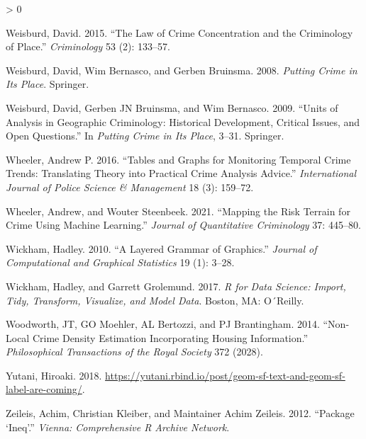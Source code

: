 \documentclass[
  krantz2]{krantz}
\newlength{\cslhangindent}
\newenvironment{CSLReferences}[2] %
 {%
  \setlength{\parindent}{0pt}
  \ifodd #1 \everypar{\setlength{\hangindent}{\cslhangindent}}\ignorespaces\fi
  \ifnum #2 > 0
  \setlength{\parskip}{#2\baselineskip}
  \fi
 }%
 {}
\begin{document}
\begin{CSLReferences}{1}{0}
\leavevmode\hypertarget{ref-Weisburd_2015}{}%
Weisburd, David. 2015. {``The Law of Crime Concentration and the Criminology of Place.''} \emph{Criminology} 53 (2): 133--57.

\leavevmode\hypertarget{ref-Weisburd_2008}{}%
Weisburd, David, Wim Bernasco, and Gerben Bruinsma. 2008. \emph{Putting Crime in Its Place}. Springer.

\leavevmode\hypertarget{ref-Weisburd_2009}{}%
Weisburd, David, Gerben JN Bruinsma, and Wim Bernasco. 2009. {``Units of Analysis in Geographic Criminology: Historical Development, Critical Issues, and Open Questions.''} In \emph{Putting Crime in Its Place}, 3--31. Springer.

\leavevmode\hypertarget{ref-Wheeler_2016}{}%
Wheeler, Andrew P. 2016. {``Tables and Graphs for Monitoring Temporal Crime Trends: Translating Theory into Practical Crime Analysis Advice.''} \emph{International Journal of Police Science \& Management} 18 (3): 159--72.

\leavevmode\hypertarget{ref-Wheeler_2021}{}%
Wheeler, Andrew, and Wouter Steenbeek. 2021. {``Mapping the Risk Terrain for Crime Using Machine Learning.''} \emph{Journal of Quantitative Criminology} 37: 445--80.

\leavevmode\hypertarget{ref-Wickham_2010}{}%
Wickham, Hadley. 2010. {``A Layered Grammar of Graphics.''} \emph{Journal of Computational and Graphical Statistics} 19 (1): 3--28.

\leavevmode\hypertarget{ref-Wickham_2017}{}%
Wickham, Hadley, and Garrett Grolemund. 2017. \emph{R for Data Science: Import, Tidy, Transform, Visualize, and Model Data}. Boston, MA: O´Reilly.

\leavevmode\hypertarget{ref-Woodworth_2014}{}%
Woodworth, JT, GO Moehler, AL Bertozzi, and PJ Brantingham. 2014. {``Non-Local Crime Density Estimation Incorporating Housing Information.''} \emph{Philosophical Transactions of the Royal Society} 372 (2028).

\leavevmode\hypertarget{ref-Yutani_2018}{}%
Yutani, Hiroaki. 2018. \url{https://yutani.rbind.io/post/geom-sf-text-and-geom-sf-label-are-coming/}.

\leavevmode\hypertarget{ref-zeileis2012package}{}%
Zeileis, Achim, Christian Kleiber, and Maintainer Achim Zeileis. 2012. {``Package {`Ineq'}.''} \emph{Vienna: Comprehensive R Archive Network}.

\end{CSLReferences}

\backmatter
\printindex
\end{document}
